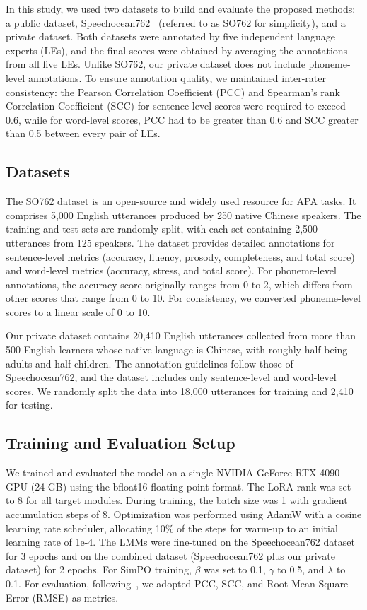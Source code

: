 \documentclass{article}
\begin{document}
In this study, we used two datasets to build and evaluate the proposed methods: a public dataset, Speechocean762~\cite{Zhang2021speechocean762} (referred to as SO762 for simplicity), and a private dataset. Both datasets were annotated by five independent language experts (LEs), and the final scores were obtained by averaging the annotations from all five LEs. Unlike SO762, our private dataset does not include phoneme-level annotations. To ensure annotation quality, we maintained inter-rater consistency: the Pearson Correlation Coefficient (PCC) and Spearman’s rank Correlation Coefficient (SCC) for sentence-level scores were required to exceed 0.6, while for word-level scores, PCC had to be greater than 0.6 and SCC greater than 0.5 between every pair of LEs.

\subsection{Datasets}
\label{ssec:data}

The SO762 dataset is an open-source and widely used resource for APA tasks. It comprises 5,000 English utterances produced by 250 native Chinese speakers. The training and test sets are randomly split, with each set containing 2,500 utterances from 125 speakers. The dataset provides detailed annotations for sentence-level metrics (accuracy, fluency, prosody, completeness, and total score) and word-level metrics (accuracy, stress, and total score). For phoneme-level annotations, the accuracy score originally ranges from 0 to 2, which differs from other scores that range from 0 to 10. For consistency, we converted phoneme-level scores to a linear scale of 0 to 10.

Our private dataset contains 20,410 English utterances collected from more than 500 English learners whose native language is Chinese, with roughly half being adults and half children. The annotation guidelines follow those of Speechocean762, and the dataset includes only sentence-level and word-level scores. We randomly split the data into 18,000 utterances for training and 2,410 for testing.

\subsection{Training and Evaluation Setup}

We trained and evaluated the model on a single NVIDIA GeForce RTX 4090 GPU (24 GB) using the bfloat16 floating-point format. The LoRA rank was set to 8 for all target modules. During training, the batch size was 1 with gradient accumulation steps of 8. Optimization was performed using AdamW with a cosine learning rate scheduler, allocating 10\% of the steps for warm-up to an initial learning rate of 1e-4. The LMMs were fine-tuned on the Speechocean762 dataset for 3 epochs and on the combined dataset (Speechocean762 plus our private dataset) for 2 epochs.  For SimPO training, $\beta$ was set to 0.1, $\gamma$ to 0.5, and $\lambda$ to 0.1. For evaluation, following~\cite{Wang2025Exploring}, we adopted PCC, SCC, and Root Mean Square Error (RMSE) as metrics.
\end{document}
